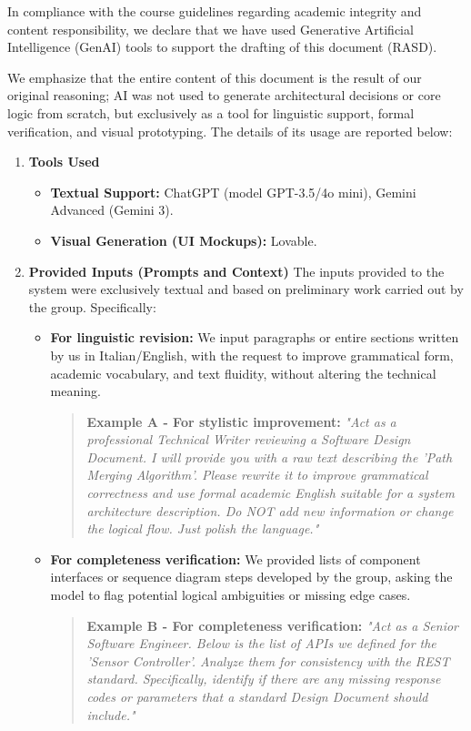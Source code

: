 In compliance with the course guidelines regarding academic integrity and content responsibility, we declare that we have used Generative Artificial Intelligence (GenAI) tools to support the drafting of this document (RASD).

We emphasize that the entire content of this document is the result of our original reasoning; AI was not used to generate architectural decisions or core logic from scratch, but exclusively as a tool for linguistic support, formal verification, and visual prototyping. The details of its usage are reported below:

\begin{enumerate}
    \item \textbf{Tools Used}
    \begin{itemize}
        \item \textbf{Textual Support:} ChatGPT (model GPT-3.5/4o mini), Gemini Advanced (Gemini 3).
        \item \textbf{Visual Generation (UI Mockups):} Lovable.
    \end{itemize}

    \item \textbf{Provided Inputs (Prompts and Context)} The inputs provided to the system were exclusively textual and based on preliminary work carried out by the group. Specifically:
    \begin{itemize}
        \item \textbf{For linguistic revision:} We input paragraphs or entire sections written by us in Italian/English, with the request to improve grammatical form, academic vocabulary, and text fluidity, without altering the technical meaning.
        \begin{quote}
            \textbf{Example A - For stylistic improvement:} \textit{"Act as a professional Technical Writer reviewing a Software Design Document. I will provide you with a raw text describing the 'Path Merging Algorithm'. Please rewrite it to improve grammatical correctness and use formal academic English suitable for a system architecture description. Do NOT add new information or change the logical flow. Just polish the language."}
        \end{quote}
        
        \item \textbf{For completeness verification:} We provided lists of component interfaces or sequence diagram steps developed by the group, asking the model to flag potential logical ambiguities or missing edge cases.
        \begin{quote}
            \textbf{Example B - For completeness verification:} \textit{"Act as a Senior Software Engineer. Below is the list of APIs we defined for the 'Sensor Controller'. Analyze them for consistency with the REST standard. Specifically, identify if there are any missing response codes or parameters that a standard Design Document should include."}
        \end{quote}
        

\end{itemize}
\end{enumerate}
